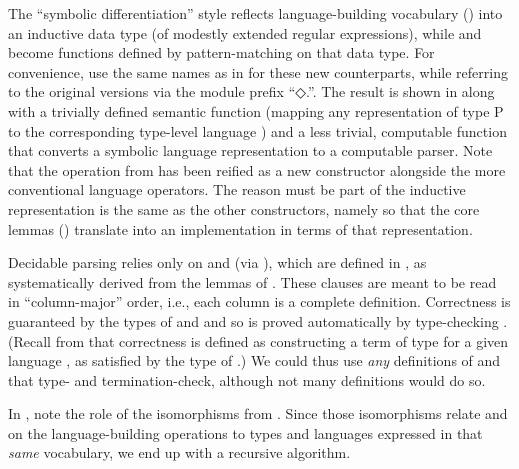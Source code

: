 \documentclass[acmsmall,screen,timestamp]{acmart}  %
\begin{document}
The ``symbolic differentiation'' style reflects language-building vocabulary () into an inductive data type (of modestly extended regular expressions), while  and  become functions defined by pattern-matching on that data type.
For convenience, use the same names as in  for these new counterparts, while referring to the original versions via the module prefix ``{◇.}\hspace{0.05em}''.
The result is shown in  along with a trivially defined semantic function {} (mapping any representation of type { \AB P} to the corresponding type-level language ) and a less trivial, computable function  {} that converts a symbolic language representation to a computable parser.
Note that the  operation from  has been reified as a new constructor alongside the more conventional language operators.
The reason  must be part of the inductive representation is the same as the other constructors, namely so that the core lemmas () translate into an implementation in terms of that representation.

Decidable parsing relies only on  and  (via {}), which are defined in , as systematically derived from the lemmas of .
These clauses are meant to be read in ``column-major'' order, i.e., each column is a complete definition.
Correctness is guaranteed by the types of  and  and so is proved automatically by type-checking .
(Recall from  that correctness is defined as constructing a term of type { } for a given language , as satisfied by the type of {}.)
We could thus use \emph{any} definitions of  and  that type- and termination-check, although not many definitions would do so.

In , note the role of the isomorphisms from .
Since those isomorphisms relate  and  on the language-building operations to types and languages expressed in that \emph{same} vocabulary, we end up with a recursive algorithm.

\rnc{}
\end{document}
